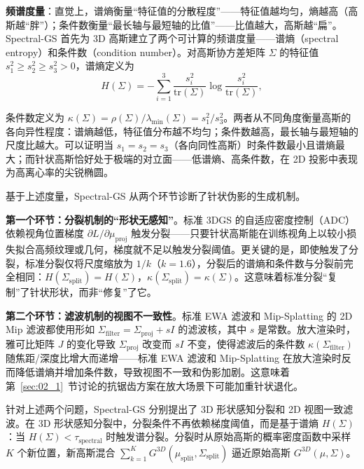 \textbf{频谱度量}：直觉上，谱熵衡量``特征值的分散程度''——特征值越均匀，熵越高（高斯越``胖''）；条件数衡量``最长轴与最短轴的比值''——比值越大，高斯越``扁''。Spectral-GS 首先为 3D 高斯建立了两个可计算的频谱度量——谱熵（spectral entropy）和条件数（condition number）。对高斯协方差矩阵 $\Sigma$ 的特征值 $s_1^2 \geq s_2^2 \geq s_3^2 > 0$，谱熵定义为
\begin{equation}
H(\Sigma) = -\sum_{i=1}^{3}\frac{s_i^2}{\mathrm{tr}(\Sigma)}\log\frac{s_i^2}{\mathrm{tr}(\Sigma)},
\label{eq:02_spectral_entropy}
\end{equation}

条件数定义为 $\kappa(\Sigma) = \rho(\Sigma)/\lambda_{\min}(\Sigma) = s_1^2/s_3^2$。两者从不同角度衡量高斯的各向异性程度：谱熵越低，特征值分布越不均匀；条件数越高，最长轴与最短轴的尺度比越大。可以证明当 $s_1 = s_2 = s_3$（各向同性高斯）时条件数最小且谱熵最大；而针状高斯恰好处于极端的对立面——低谱熵、高条件数，在 2D 投影中表现为高离心率的尖锐椭圆。

基于上述度量，Spectral-GS 从两个环节诊断了针状伪影的生成机制。

\textbf{第一个环节：分裂机制的``形状无感知''}。标准 3DGS 的自适应密度控制（ADC）依赖视角位置梯度 $\partial L/\partial\mu_{\mathrm{proj}}$ 触发分裂——只要针状高斯能在训练视角上以较小损失拟合高频纹理或几何，梯度就不足以触发分裂阈值。更关键的是，即使触发了分裂，标准分裂仅将尺度缩放为 $1/k$（$k=1.6$），分裂后的谱熵和条件数与分裂前完全相同：$H(\Sigma_{\mathrm{split}}) = H(\Sigma)$，$\kappa(\Sigma_{\mathrm{split}}) = \kappa(\Sigma)$。这意味着标准分裂``复制''了针状形状，而非``修复''了它。

\textbf{第二个环节：滤波机制的视图不一致性}。标准 EWA 滤波和 Mip-Splatting 的 2D Mip 滤波都使用形如 $\Sigma_{\mathrm{filter}} = \Sigma_{\mathrm{proj}} + sI$ 的滤波核，其中 $s$ 是常数。放大渲染时，雅可比矩阵 $J$ 的变化导致 $\Sigma_{\mathrm{proj}}$ 改变而 $sI$ 不变，使得滤波后的条件数 $\kappa(\Sigma_{\mathrm{filter}})$ 随焦距/深度比增大而递增——标准 EWA 滤波和 Mip-Splatting 在放大渲染时反而降低谱熵并增加条件数，导致视图不一致和伪影加剧。这意味着第~\ref{sec:02_1}~节讨论的抗锯齿方案在放大场景下可能加重针状退化。

针对上述两个问题，Spectral-GS 分别提出了 3D 形状感知分裂和 2D 视图一致滤波。在 3D 形状感知分裂中，分裂条件不再依赖梯度阈值，而是基于谱熵 $H(\Sigma)$：当 $H(\Sigma) < \tau_{\mathrm{spectral}}$ 时触发谱分裂。分裂时从原始高斯的概率密度函数中采样 $K$ 个新位置，新高斯混合 $\sum_{k=1}^{K}G^{3D}(\mu_{\mathrm{split}}, \Sigma_{\mathrm{split}})$ 逼近原始高斯 $G^{3D}(\mu, \Sigma)$。

